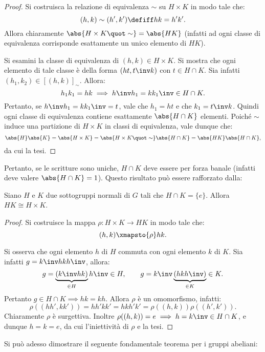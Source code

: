 \documentclass[12pt]{scrartcl}
\begin{document}
	\begin{proof}
		Si costruisca la relazione di equivalenza $\sim$
		su $H \times K$ in modo tale che:
		\[ (h,k) \sim (h',k') \defiff hk=h'k'. \]
		Allora chiaramente $\abs{H \times K \quot \sim} = \abs{HK}$
		(infatti ad ogni classe di equivalenza corrisponde esattamente un unico elemento di $HK$). \bigskip
		
		Si esamini la classe di equivalenza di $(h,k) \in H \times K$. Si
		mostra che ogni elemento di tale classe è della forma
		$(ht,t\inv k)$ con $t \in H \cap K$. Sia infatti $(h_1,k_2) \in
		[(h,k)]_\sim$. Allora:
		\[
			h_1k_1=hk \implies h\inv h_1 = k k_1\inv \in H \cap K.
		\]
		Pertanto, se $h\inv h_1 = k k_1\inv = t$, vale che $h_1=ht$ e che $k_1 = t\inv k$.
		Quindi ogni classe di equivalenza contiene esattamente $\abs{H \cap K}$ elementi.
		Poiché $\sim$ induce una partizione di $H \times K$ in classi
		di equivalenza, vale dunque che:
		\[
			\abs{H} \abs{K} = \abs{H \times K} = \abs{H \times K \quot \sim} \abs{H \cap K} = \abs{HK} \abs{H \cap K},
		\]
		da cui la tesi. 
	\end{proof}

	Pertanto, se le scritture sono uniche, $H \cap K$ deve essere
	per forza banale (infatti deve valere $\abs{H \cap K} = 1$).
	Questo risultato può essere rafforzato dalla:
	
	\begin{proposition}
		Siano $H$ e $K$ due sottogruppi normali di $G$ tali che
		$H \cap K = \{e\}$. Allora $HK \cong H \times K$.
	\end{proposition}

	\begin{proof}
		Si costruisce la mappa $\rho : H \times K \to HK$
		in modo tale che:
		\[ (h,k) \xmapsto{\rho} hk. \]
		
		Si osserva che ogni elemento $h$ di $H$ commuta con
		ogni elemento $k$ di $K$. Sia infatti $g = k\inv hkh\inv$, allora:
		\[
			g = \underbrace{(k\inv hk)}_{\in H} h\inv \in H, \qquad g = k\inv \underbrace{(hkh\inv)}_{\in K} \in K.
		\]
		Pertanto $g \in H \cap K \implies hk=kh$. Allora $\rho$
		è un omomorfismo, infatti:
		\[
			\rho((hh',kk')) = hh'kk' = hkh'k' = \rho((h,k)) \rho((h',k')).
		\]
		Chiaramente $\rho$ è surgettiva. Inoltre $\rho((h,k)) = e \implies h = k\inv \in H \cap K$,
		e dunque $h = k = e$, da cui l'iniettività di $\rho$
		e la tesi.
	\end{proof} \bigskip


	Si può adesso dimostrare il seguente fondamentale
	teorema per i gruppi abeliani:
	
\end{document}
